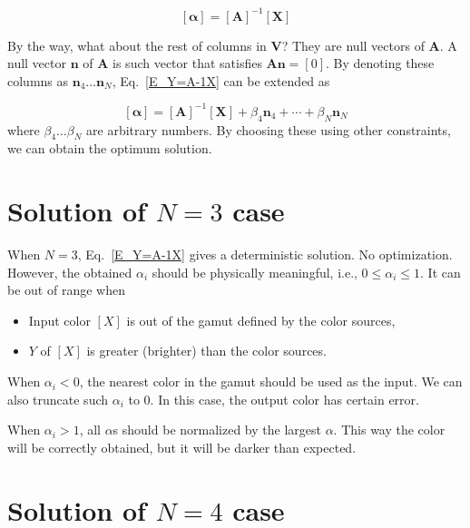\documentclass[dvipdfmx,uplatex,a4paper]{article}
\begin{document}
\begin{equation}
  \label{E_Y=A-1X}
  \left[ \boldsymbol{\alpha} \right] =
  \left[ \boldsymbol{A} \right]^{-1}
  \left[ \boldsymbol{X} \right]
\end{equation}

By the way, what about the rest of columns in $ \boldsymbol{V} $? They are null vectors of $ \boldsymbol{A} $. A null vector $\boldsymbol{n}$ of $ \boldsymbol{A}$ is such vector that satisfies $ \boldsymbol{A} \boldsymbol{n} = [0]$. By denoting these columns as $ \boldsymbol{n}_4 \ldots \boldsymbol{n}_N $, Eq.~\eqref{E_Y=A-1X} can be extended as

\begin{equation}
  \label{E_Y=A-1X+n}
  \left[ \boldsymbol{\alpha} \right] =
  \left[ \boldsymbol{A} \right]^{-1}
  \left[ \boldsymbol{X} \right]
  + \beta_4 \boldsymbol{n}_4 + \cdots + \beta_N \boldsymbol{n}_N
\end{equation}
\noindent
where $ \beta_4 \ldots \beta_N $ are arbitrary numbers. By choosing these using other constraints, we can obtain the optimum solution.





\section{Solution of $N=3$ case}

When $N=3$, Eq.~\eqref{E_Y=A-1X} gives a deterministic solution. No optimization. However, the obtained $ \alpha_i $ should be physically meaningful, i.e., $ 0 \leq \alpha_i \leq 1 $. It can be out of range when
\begin{itemize}
  \item Input color $[X]$ is out of the gamut defined by the color sources,
  \item $Y$ of $[X]$ is greater (brighter) than the color sources.
\end{itemize}
\noindent
When $ \alpha_i < 0$, the nearest color in the gamut should be used as the input. We can also truncate such $\alpha_i$ to 0. In this case, the output color has certain error.

When $ \alpha_i > 1 $, all $\alpha$s should be normalized by the largest $\alpha$. This way the color will be correctly obtained, but it will be darker than expected.




\section{Solution of $N=4$ case}
\end{document}
